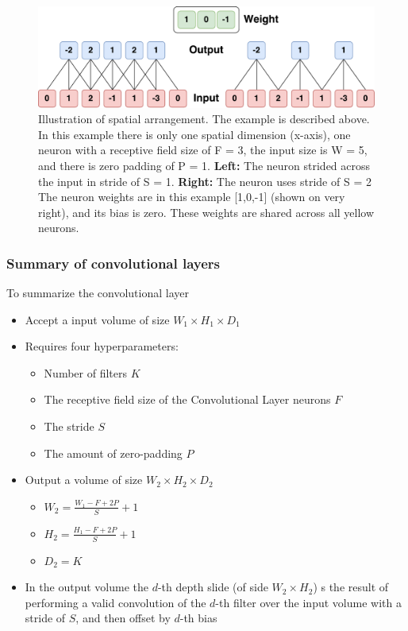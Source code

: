 \begin{figure}[H]
	\centering
	\includegraphics[width=1\textwidth]{Figures/Spatial_size.pdf}
	\caption{Illustration of spatial arrangement. The example is described above. In this example there is only one spatial dimension (x-axis), one neuron with a receptive field size of F = 3, the input size is W = 5, and there is zero padding of P = 1. \textbf{Left:} The neuron strided across the input in stride of S = 1. \textbf{Right:} The neuron uses stride of S = 2
		The neuron weights are in this example [1,0,-1] (shown on very right), and its bias is zero. These weights are shared across all yellow neurons. \cite{CNN_course}}
	\label{fig:Spatial_size}
\end{figure} 

\subsubsection{Summary of convolutional layers}
To summarize the convolutional layer
\begin{itemize}
	\item Accept a input volume of size $W_1 \times  H_1 \times  D_1$
	\item Requires four hyperparameters:
	\begin{itemize}
		\item Number of filters $K$
		\item The receptive field size of the Convolutional Layer neurons $F$ 
		\item The stride $S$
		\item The amount of zero-padding $P$ 
	\end{itemize}
	\item Output a volume of size $W_2 \times  H_2 \times  D_2$
	\begin{itemize}
		\item $W_2 = \frac{W_1-F+2P}{S}+1$
		\item $H_2 = \frac{H_1-F+2P}{S}+1$
		\item $D_2 = K$
	\end{itemize}
	\item In the output volume the $d$-th depth slide (of side $W_2 \times  H_2$) s the result of performing a valid convolution of the $d$-th filter over the input volume with a stride of $S$, and then offset by $d$-th bias
\end{itemize}

